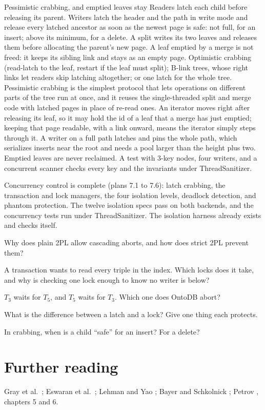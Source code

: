 \begin{decision}{Pessimistic crabbing, and emptied leaves stay}
 Readers latch each child before releasing its parent. Writers
latch the header and the path in write mode and release every latched
ancestor as soon as the newest page is safe: not full, for an insert; above its
minimum, for a delete. A split writes its two leaves and releases them before
allocating the parent's new page. A leaf emptied by a merge is not freed: it
keeps its sibling link and stays as an empty page.
 Optimistic crabbing (read-latch to the leaf, restart if
the leaf must split); B-link trees, whose right links let readers skip
latching altogether; or one latch for the whole tree.
 Pessimistic crabbing is the simplest protocol that lets operations
on different parts of the tree run at once, and it reuses the single-threaded
split and merge code with latched pages in place of re-read ones. An iterator
moves right after releasing its leaf, so it may hold the id of a leaf that a
merge has just emptied; keeping that page readable, with a link onward, means
the iterator simply steps through it.
 A writer on a full path latches and pins the whole path, which
serializes inserts near the root and needs a pool larger than the height plus
two. Emptied leaves are never reclaimed. A test with 3-key nodes, four writers,
and a concurrent scanner checks every key and the invariants under
ThreadSanitizer.
\end{decision}

\begin{status}
Concurrency control is complete (plans 7.1 to 7.6): latch crabbing, the
transaction and lock managers, the four isolation levels, deadlock detection,
and phantom protection. The twelve isolation specs pass on both backends, and
the concurrency tests run under ThreadSanitizer. The isolation harness
already exists and checks itself.
\end{status}

\begin{checkyourself}
\item Why does plain 2PL allow cascading aborts, and how does strict 2PL prevent them?
\item A transaction wants to read every triple in the  index. Which locks does it take, and why is checking one lock enough to know no writer is below?
\item $T_3$ waits for $T_5$, and $T_5$ waits for $T_3$. Which one does OntoDB abort?
\item What is the difference between a latch and a lock? Give one thing each protects.
\item In crabbing, when is a child ``safe'' for an insert? For a delete?
\end{checkyourself}

\section*{Further reading}
Gray et al.\ \cite{gray1976}; Eswaran et al.\ \cite{eswaran}; Lehman and Yao
\cite{lehmanyao}; Bayer and Schkolnick \cite{bayerschkolnick}; Petrov
\cite{petrov}, chapters 5 and 6.
